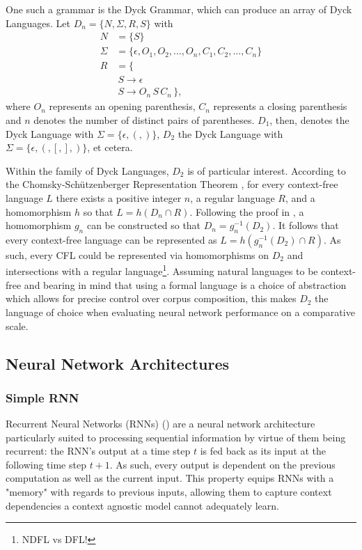 One such a grammar is the Dyck Grammar, which can produce an array of Dyck Languages. Let $D_{n} = \lbrace N, \Sigma, R, S \rbrace$ with
\begin{align*}
	N &= \lbrace S \rbrace \\
	\Sigma &= \lbrace \epsilon, O_{1}, O_{2}, \dots, O_{n}, C_{1}, C_{2}, \dots, C_{n} \rbrace \\
	R &= \lbrace \\
		 & \: S \rightarrow \epsilon \\
		 & \: S \rightarrow O_{n} \, S \, C_{n} \, \rbrace ,
\end{align*}
where $O_{n}$ represents an opening parenthesis, $C_{n}$ represents a closing parenthesis and $n$ denotes the number of distinct pairs of parentheses. $D_1$, then, denotes the Dyck Language with $\Sigma = \lbrace \epsilon, (, ) \rbrace$, $D_2$ the Dyck Language with $\Sigma = \lbrace \epsilon, (, [, ], ) \rbrace$, et cetera.

Within the family of Dyck Languages, $D_2$ is of particular interest. According to the Chomsky-Schützenberger Representation Theorem \citep{Chomsky1963}, for every context-free language $L$ there exists a positive integer $n$, a regular language $R$, and a homomorphism $h$ so that $L = h(D_{n} \cap R)$. Following the proof in \cite{Autebert1997}, a homomorphism $g_{n}$ can be constructed so that $D_{n} = g_{n}^{-1}(D_{2})$. It follows that every context-free language can be represented as $L = h(g_{n}^{-1}(D_{2}) \cap R)$. As such, every CFL could be represented via homomorphisms on $D_2$ and intersections with a regular language\footnote{NDFL vs DFL!}. Assuming natural languages to be context-free and bearing in mind that using a formal language is a choice of abstraction which allows for precise control over corpus composition, this makes $D_2$ the language of choice when evaluating neural network performance on a comparative scale.

\subsection{Neural Network Architectures}\label{neuralNetworkArchitectures}

\subsubsection{Simple RNN}\label{SRNN}
Recurrent Neural Networks (RNNs) (\cite{Elman1990}) are a neural network architecture particularly suited to processing sequential information by virtue of them being recurrent: the RNN's output at a time step $t$ is fed back as its input at the following time step $t+1$. As such, every output is dependent on the previous computation as well as the current input. This property equips RNNs with a "memory" with regards to previous inputs, allowing them to capture context dependencies a context agnostic model cannot adequately learn.


